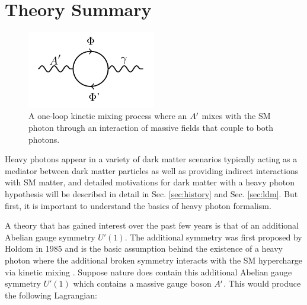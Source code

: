 


\section{Theory Summary}\label{sec:theory}

\begin{figure}
    \centering
    \includegraphics[width=0.5\textwidth]{figs/motivation/oneloop.png}
    \caption{A one-loop kinetic mixing process where an $A^\prime$ mixes with the SM photon through an interaction of massive fields that couple to both photons.}
    \label{fig:km}
\end{figure}

Heavy photons appear in a variety of dark matter scenarios typically acting as a mediator between dark matter particles as well as providing indirect interactions with SM matter, and detailed motivations for dark matter with a heavy photon hypothesis will be described in detail in Sec. \ref{sec:history} and Sec. \ref{sec:ldm}. But first, it is important to understand the basics of heavy photon formalism.

A theory that has gained interest over the past few years is that of an additional Abelian gauge symmetry $U'(1)$. The additional symmetry was first proposed by Holdom in 1985 and is the basic assumption behind the existence of a heavy photon where the additional broken symmetry interacts with the SM hypercharge via kinetic mixing \cite{Holdom:1985ag}. Suppose nature does contain this additional Abelian gauge symmetry $U'(1)$ which contains a massive gauge boson $A^\prime$. This would produce the following Lagrangian:

